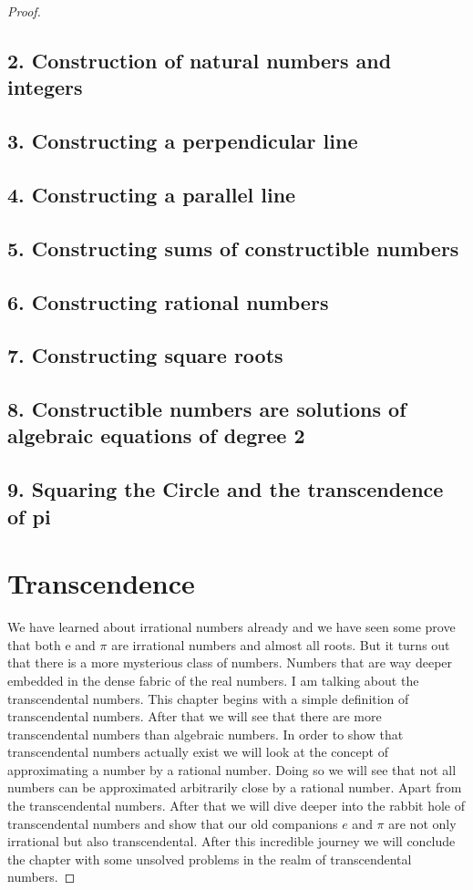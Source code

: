 \documentclass{article}
\theoremstyle{definition}
\begin{document}
\begin{proof}
\subsection{2. Construction of natural numbers and integers}
\subsection{3. Constructing a perpendicular line}
\subsection{4. Constructing a parallel line}
\subsection{5. Constructing sums of constructible numbers}
\subsection{6. Constructing rational numbers}
\subsection{7. Constructing square roots}
\subsection{8. Constructible numbers are solutions of algebraic equations of degree 2}
\subsection{9. Squaring the Circle and the transcendence of pi}
\newpage 











\section{Transcendence}

We have learned about irrational numbers already and we have seen some prove that both e and $\pi$ are irrational numbers and almost all roots. But it turns out that there is a more mysterious class of numbers. Numbers that are way deeper embedded in the dense fabric of the real numbers. I am talking about the transcendental numbers. This chapter begins with a simple definition of transcendental numbers. After that we will see that there are more transcendental numbers than algebraic numbers. In order to show that transcendental numbers actually exist we will look at the concept of approximating a number by a rational number. Doing so we will see that not all numbers can be approximated arbitrarily close  by a rational number. Apart from the transcendental numbers. After that we will dive deeper into the rabbit hole of transcendental numbers and show that our old companions $e$ and $\pi$ are not only irrational but also transcendental. After this incredible journey we will conclude the chapter with some unsolved problems in the realm of transcendental numbers.


\end{proof}
\end{document}
